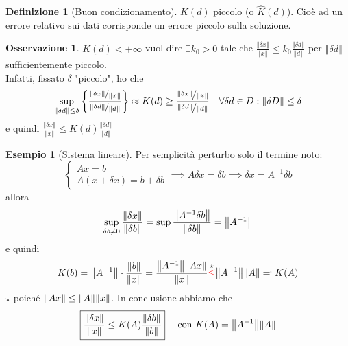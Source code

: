 \documentclass[a4paper,10pt]{article}
\theoremstyle{definition}
\theoremstyle{indentdefinition}
\newtheorem{defn}{Definizione}[section]
\theoremstyle{indenttheorem}
\theoremstyle{myremark}
\newtheorem*{rem*}{Osservazione}
\newtheorem{example*}{Esempio}
\theoremstyle{indentgeneral}
\theoremstyle{plain}
\theoremstyle{plain}
\newenvironment{myboxed} 
{\noindent\begin{lrbox}{\mybox}\begin{minipage}{\textwidth}}
{\end{minipage}\end{lrbox}\fbox{\usebox{\mybox}}}
\begin{document}
\begin{defn}[Buon condizionamento]
$K\left(d\right)$ piccolo (o $\hat{K}\left(d\right)$). Cioè ad un errore relativo sui dati corrisponde un errore piccolo sulla soluzione.
\end{defn}

\begin{myboxed}
\begin{rem*}
$K\left(d\right)<+\infty$ vuol dire $\exists k_{0}>0$ tale che $\frac{\left\Vert \delta x\right\Vert }{\left\Vert x\right\Vert }\leq k_{0}\frac{\left\Vert \delta d\right\Vert }{\left\Vert d\right\Vert }$
per $\left\Vert \delta d\right\Vert $ sufficientemente piccolo. \\
Infatti, fissato $\delta$ "piccolo", ho che 
$$\sup_{\left\Vert \delta d\right\Vert \leq\delta}\left\{ \frac{\nicefrac{\left\Vert \delta x\right\Vert }{\left\Vert x\right\Vert }}{\nicefrac{\left\Vert \delta d\right\Vert }{\left\Vert d\right\Vert }}\right\} \approx K(d)\ge \frac{\nicefrac{\left\Vert \delta x\right\Vert }{\left\Vert x\right\Vert }}{\nicefrac{\left\Vert \delta d\right\Vert }{\left\Vert d\right\Vert }}\quad \forall \delta d\in D:\norm{\delta D}\le \delta$$
e quindi $\frac{\left\Vert \delta x\right\Vert }{\left\Vert x\right\Vert }\leq K(d)\frac{\left\Vert \delta d\right\Vert }{\left\Vert d\right\Vert }$
\end{rem*}
\begin{example*}[Sistema lineare] Per semplicità perturbo solo il termine noto:
$$\begin{cases}
    Ax=b \\
    A\left(x+\delta x\right)=b+\delta b 
\end{cases}\implies A\delta x=\delta b\implies \delta x=A^{-1}\delta b$$
allora
$$\sup_{\delta  b\ne 0}\frac{\norm{\delta x}}{\norm{\delta b}}=\sup\frac{\norm{A^{-1}\delta b}}{\norm{\delta b}}=\norm{A^{-1}}$$
e quindi 
$$K(b)=\norm{A^{-1}}\cdot\frac{\norm{b}}{\norm{x}}=\frac{\norm{A^{-1}}\norm{Ax}}{\norm{x}}\overset{\star}{\textcolor{red}{\le}}\norm{A^{-1}}\norm{A}\eqqcolon K(A) $$
$\star$ poiché $\norm{Ax}\le\norm{A}\norm{x}$. In conclusione abbiamo che 
$$\boxed{\frac{\norm{\delta x}}{\norm{x}}\le K(A)\frac{\norm{\delta b}}{\norm{b}}} \quad \text{ con } K(A)=\norm{A^{-1}}\norm{A}$$
\end{example*}
\end{myboxed}
\end{document}
